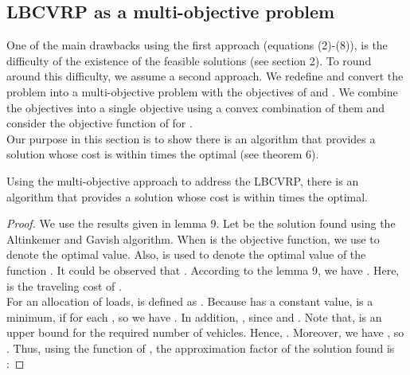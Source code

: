 \subsection{LBCVRP as a multi-objective problem}
\noindent One of the main drawbacks using the first approach (equations (2)-(8)), is the difficulty of the existence of the feasible solutions (see section 2). To round around this difficulty, we assume a second approach. We redefine and convert the problem into a multi-objective problem with the objectives of  and . We combine the objectives into a single objective using a convex combination of them and consider the objective function of  for . \\
\indent Our purpose in this section is to show there is an algorithm that provides a solution whose cost is within  times the optimal (see theorem 6).
\begin{theorem}
Using the multi-objective approach to address the LBCVRP, there is an algorithm that provides a solution whose cost is within  times the optimal.
\end{theorem}
\begin{proof}
\indent We use the results given in lemma 9. Let  be the solution found using the Altinkemer and Gavish algorithm. When  is the objective function, we use  to denote the optimal value. Also,  is used to denote the optimal value of the function . It could be observed that . According to the lemma 9, we have . Here,  is the traveling cost of .\\ 
\indent  For an allocation  of loads,  is defined as . Because  has a constant value,  is a minimum, if  for each , so we have  . In addition, , since  and . Note that,  is an upper bound for the required number of vehicles. Hence, . Moreover, we have  , so . Thus, using the function of , the approximation factor of the solution found is : 


\end{proof}
